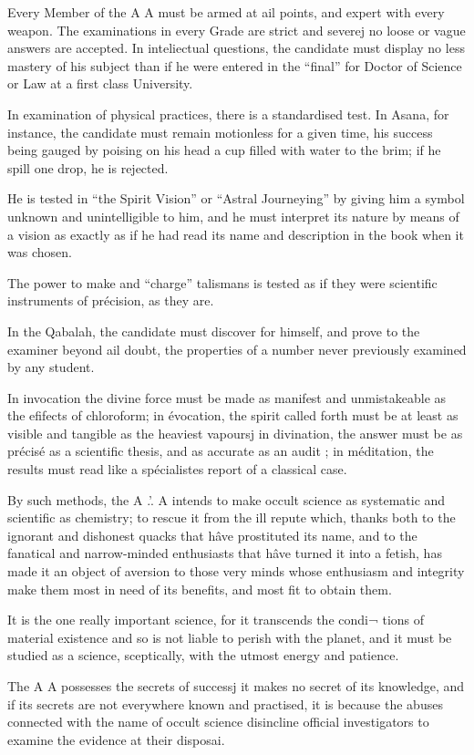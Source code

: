 Every Member of the A A must be armed at ail points, and expert with every weapon. The examinations in every Grade are strict and severej no loose or vague answers are accepted. In inteliectual questions, the candidate must display no less mastery of his subject than if he were entered in the “final” for Doctor of Science or Law at a first class University.

In examination of physical practices, there is a standardised test.  In Asana, for instance, the candidate must remain motionless for a given time, his success being gauged by poising on his head a cup filled with water to the brim; if he spill one drop, he is rejected.

He is tested in “the Spirit Vision” or “Astral Journeying” by giving him a symbol unknown and unintelligible to him, and he must interpret its nature by means of a vision as exactly as if he had read its name and description in the book when it was chosen.

The power to make and “charge” talismans is tested as if they were scientific instruments of précision, as they are.

In the Qabalah, the candidate must discover for himself, and prove to the examiner beyond ail doubt, the properties of a number never previously examined by any student.

In invocation the divine force must be made as manifest and unmistakeable as the efifects of chloroform; in évocation, the spirit called forth must be at least as visible and tangible as the heaviest vapoursj in divination, the answer must be as précisé as a scientific thesis, and as accurate as an audit ; in méditation, the results must read like a spécialistes report of a classical case.

By such methods, the A .'. A intends to make occult science as systematic and scientific as chemistry; to rescue it from the ill repute which, thanks both to the ignorant and dishonest quacks that hâve prostituted its name, and to the fanatical and narrow-minded enthusiasts that hâve turned it into a fetish, has made it an object of aversion to those very minds whose enthusiasm and integrity make them most in need of its benefits, and most fit to obtain them.

It is the one really important science, for it transcends the condi¬ tions of material existence and so is not liable to perish with the planet, and it must be studied as a science, sceptically, with the utmost energy and patience.

The A A possesses the secrets of successj it makes no secret of its knowledge, and if its secrets are not everywhere known and practised, it is because the abuses connected with the name of occult science disincline official investigators to examine the evidence at their disposai.

